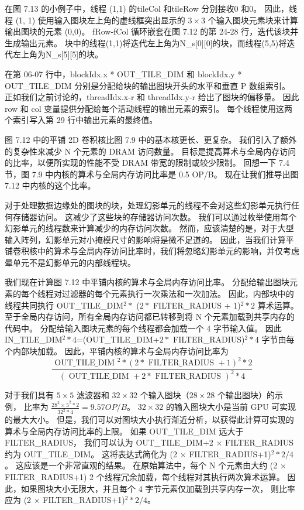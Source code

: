 在图 7.13 的小例子中，线程 (1,1) 的tileCol 和tileRow 分别接收0 和0。 
因此，线程 (1, 1) 使用输入图块左上角的虚线框突出显示的 $3 \times 3$ 个输入图块元素块来计算输出图块的元素 (0,0)。 
fRow-fCol 循环嵌套在图 7.12 的第 24-28 行，迭代该块并生成输出元素。 
块中的线程(1,1)将迭代左上角为N\_s[0][0]的块，而线程(5,5)将迭代左上角为N\_s[5][5]的块。

在第 06-07 行中，blockIdx.x * OUT\_TILE\_DIM 和 blockIdx.y * OUT\_TILE\_DIM 
分别是分配给块的输出图块开头的水平和垂直 P 数组索引。 
正如我们之前讨论的，threadIdx.x-r 和 threadIdx.y-r 给出了图块的偏移量。 
因此 row 和 col 变量提供分配给每个活动线程的输出元素的索引。 每个线程使用这两个索引写入第 29 行中输出元素的最终值。

图 7.12 中的平铺 2D 卷积核比图 7.9 中的基本核更长、更复杂。 我们引入了额外的复杂性来减少 N 个元素的 DRAM 访问数量。 
目标是提高算术与全局内存访问的比率，以便所实现的性能不受 DRAM 带宽的限制或较少限制。 
回想一下 7.4 节，图 7.9 中内核的算术与全局内存访问比率是 0.5 OP/B。 现在让我们推导出图 7.12 中内核的这个比率。

对于处理数据边缘处的图块的块，处理幻影单元的线程不会对这些幻影单元执行任何存储器访问。 这减少了这些块的存储器访问次数。 
我们可以通过枚举使用每个幻影单元的线程数来计算减少的内存访问次数。 
然而，应该清楚的是，对于大型输入阵列，幻影单元对小掩模尺寸的影响将是微不足道的。 
因此，当我们计算平铺卷积核中的算术与全局内存访问比率时，我们将忽略幻影单元的影响，并仅考虑晕单元不是幻影单元的内部线程块。

我们现在计算图 7.12 中平铺内核的算术与全局内存访问比率。 
分配给输出图块元素的每个线程对过滤器的每个元素执行一次乘法和一次加法。 
因此，内部块中的线程共同执行 OUT\_TILE\_DIM$^2 *$ ($2*$ FILTER\_RADIUS + 1)$^2 *2$ 算术运算。 
至于全局内存访问，所有全局内存访问都已转移到将 N 个元素加载到共享内存的代码中。 
分配给输入图块元素的每个线程都会加载一个 4 字节输入值。 
因此 IN\_TILE\_DIM$^2 *4$=(OUT\_TILE\_DIM+$2*$ FILTER\_RADIUS)$^2 * 4$ 字节由每个内部块加载。 
因此，平铺内核的算术与全局内存访问比率为
\begin{equation*}
\frac{\text { OUT\_TILE\_DIM }^{2}*(2 * \text { FILTER\_RADIUS }+1)^{2}* 2}{(\text { OUT\_TILE\_DIM }+2 * \text { FILTER\_RADIUS })^{2} * 4}
\end{equation*}

对于我们具有 $5 \times 5$ 滤波器和 $32 \times 32$ 个输入图块（$28 \times 28$ 个输出图块）的示例，
比率为 $\frac{28^{2} \times 5^{2} *2}{32^{2} * 4}=9.57 O P / B$。 
$32 \times 32$ 的输入图块大小是当前 GPU 可实现的最大大小。 
但是，我们可以对图块大小执行渐近分析，以获得此计算可实现的算术与全局内存访问比率的上限。 
如果 OUT\_TILE\_DIM 远大于 FILTER\_RADIUS，
我们可以认为 OUT\_TILE\_DIM+2 $\times$ FILTER\_RADIUS 约为 OUT\_TILE\_DIM。 
这将表达式简化为 (2 $\times$ FILTER\_RADIUS+1)$^2 * 2/4$。 这应该是一个非常直观的结果。 
在原始算法中，每个 N 个元素由大约 (2 $\times$ FILTER\_RADIUS+1) 2 个线程冗余加载，每个线程对其执行两次算术运算。 
因此，如果图块大小无限大，并且每个 4 字节元素仅加载到共享内存一次，
则比率应为 (2 $\times$ FILTER\_RADIUS+1)$^2 * 2/4$。

